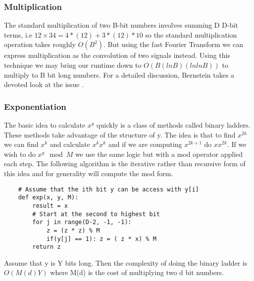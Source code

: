 \documentclass{article}
\begin{document}
\subsubsection{Multiplication}
The standard multiplication of two B-bit numbers involves summing D D-bit terms, i.e $12 \times 34 = 4*(12) + 3*(12) *10$ so the standard multiplication operation takes roughly $O(B^2)$.  But using the fast Fourier Transform we can express multiplication as the convolution of two signals instead. Using this technique we may bring our runtime down to $O(B (ln B) ( ln ln B))$ to multiply to B bit long numbers. For a detailed discussion, Bernstein takes a devoted look at the issue \cite{bernstein}. 
\subsubsection{Exponentiation}
The basic idea to calculate $x^y$ quickly is a class of methods called binary ladders. These methods take advantage of the structure of y. The idea is that to find $x^{2k}$ we can find $x^k$ and calculate $x^k x^k$ and if we are computing $x^{2k + 1}$ do $x x^{2k}$. If we wish to do $x^y \mod M$ we use the same logic but with a mod operator applied each step. The following algorithm is the iterative rather than recursive form of this idea and for generality will compute the mod form. 
\begin{verbatim}
    # Assume that the ith bit y can be access with y[i]
    def exp(x, y, M):
        result = x
        # Start at the second to highest bit
        for j in range(D-2, -1, -1):
            z = (z * z) % M
            if(y[j] == 1): z = ( z * x) % M
        return z
\end{verbatim}
Assume that y is Y bits long. Then the complexity of doing the binary ladder is $O(M(d)Y)$ where M(d) is the cost of multiplying two d bit numbers. 
\end{document}
